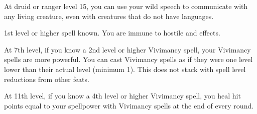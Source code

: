     At druid or ranger level 15, you can use your wild speech to communicate with any living creature, even with creatures that do not have languages.

    \featpres 1st level or higher  spell known.
    \featben You are immune to hostile  and  effects.

    At 7th level, if you know a 2nd level or higher Vivimancy spell, your Vivimancy spells are more powerful.
    You can cast Vivimancy spells as if they were one level lower than their actual level (minimum 1).
    This does not stack with spell level reductions from other feats.

    At 11th level, if you know a 4th level or higher Vivimancy spell, you heal hit points equal to your spellpower with Vivimancy spells at the end of every round.

